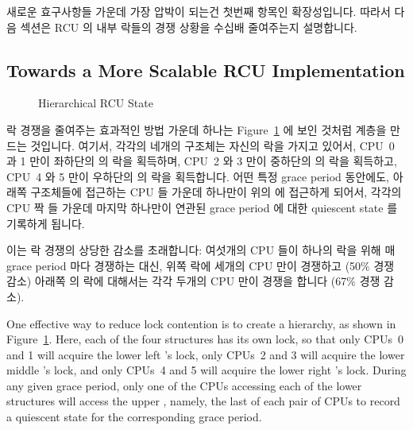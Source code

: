 새로운 효구사항들 가운데 가장 압박이 되는건 첫번째 항목인 확장성입니다.
따라서 다음 섹션은 RCU 의 내부 락들의 경쟁 상황을 수십배 줄여주는지 설명합니다.
\iffalse

The most pressing of the new requirements is the first one, scalability.
The next section therefore describes how to make order-of-magnitude reductions
in contention on RCU's internal locks.
\fi

\subsection{Towards a More Scalable RCU Implementation}
\label{app:rcuimpl:rcutree:Towards a More Scalable RCU Implementation}

\begin{figure}[htb]
\centering
{}
\caption{Hierarchical RCU State}
\label{fig:app:rcuimpl:rcutree:Hierarchical RCU State}
\end{figure}

락 경쟁을 줄여주는 효과적인 방법 가운데 하나는
Figure~\ref{fig:app:rcuimpl:rcutree:Hierarchical RCU State} 에 보인 것처럼
계층을 만드는 것입니다.
여기서, 각각의 네개의  구조체는 자신의 락을 가지고 있어서, CPU~0
과 1 만이 좌하단의  의 락을 획득하며, CPU~2 와 3 만이 중하단의
 의 락을 획득하고, CPU~4 와 5 만이 우하단의  의 락을
획득합니다.
어떤 특정 grace period 동안에도, 아래쪽  구조체들에 접근하는 CPU
들 가운데 하나만이 위의  에 접근하게 되어서, 각각의 CPU 짝 들
가운데 마지막 하나만이 연관된 grace period 에 대한 quiescent state 를 기록하게
됩니다.

이는 락 경쟁의 상당한 감소를 초래합니다:
여섯개의 CPU 들이 하나의 락을 위해 매 grace period 마다 경쟁하는 대신, 위쪽
 락에 세개의 CPU 만이 경쟁하고 (50\% 경쟁 감소) 아래쪽
 의 락에 대해서는 각각 두개의 CPU 만이 경쟁을 합니다 (67\% 경쟁
감소).
\iffalse

One effective way to reduce lock contention is to create a hierarchy,
as shown in
Figure~\ref{fig:app:rcuimpl:rcutree:Hierarchical RCU State}.
Here, each of the four  structures has its own lock,
so that only CPUs~0 and 1 will acquire the lower left
's lock, only CPUs~2 and 3 will acquire the
lower middle 's lock, and only CPUs~4 and 5
will acquire the lower right 's lock.
During any given grace period,
only one of the CPUs accessing each of the lower 
structures will access the upper , namely, the
last of each pair of CPUs to record a quiescent state for the corresponding
grace period.

